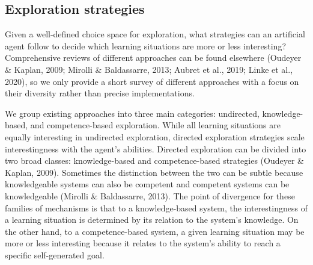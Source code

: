 \subsection{Exploration strategies}
Given a well-defined choice space for exploration, what strategies can an artificial agent follow to decide which learning situations are more or less interesting? Comprehensive reviews of different approaches can be found elsewhere (Oudeyer \& Kaplan, 2009; Mirolli \& Baldassarre, 2013; Aubret et al., 2019; Linke et al., 2020), so we only provide a short survey of different approaches with a focus on their diversity rather than precise implementations. 

We group existing approaches into three main categories: undirected, knowledge-based, and competence-based exploration. While all learning situations are equally interesting in undirected exploration, directed exploration strategies scale interestingness with the agent’s abilities. Directed exploration can be divided into two broad classes: knowledge-based and competence-based strategies (Oudeyer \& Kaplan, 2009). Sometimes the distinction between the two can be subtle because knowledgeable systems can also be competent and competent systems can be knowledgeable (Mirolli \& Baldassarre, 2013). The point of divergence for these families of mechanisms is that to a knowledge-based system, the interestingness of a learning situation is determined by its relation to the system’s knowledge. On the other hand, to a competence-based system, a given learning situation may be more or less interesting because it relates to the system’s ability to reach a specific self-generated goal.

